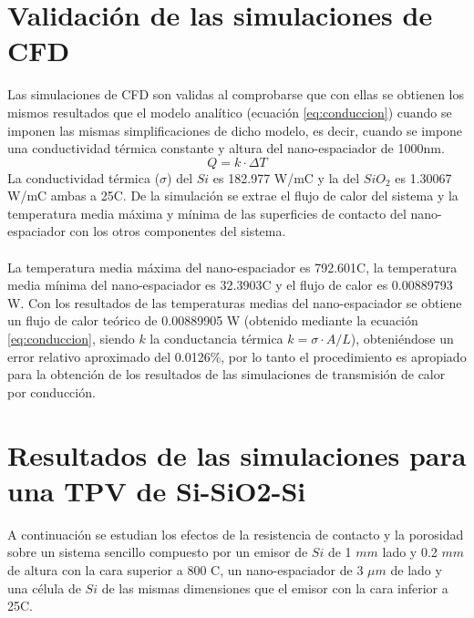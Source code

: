 \section{Validación de las simulaciones de CFD}
Las simulaciones de CFD son validas al comprobarse que con ellas se obtienen los mismos resultados que el modelo analítico (ecuación \eqref{eq:conduccion}) cuando se imponen las mismas simplificaciones de dicho modelo, es decir, cuando se impone una conductividad térmica constante y altura del nano-espaciador de 1000nm.
\begin{equation}
Q=k\cdot \Delta T
\label{eq:conduccion}
\end{equation}
La conductividad térmica ($\sigma$) del $Si$ es 182.977 W/m\textdegree C y la del $SiO_2$ es 1.30067 W/m\textdegree C ambas a 25\textdegree C. De la simulación se extrae el flujo de calor del sistema y la temperatura media máxima y mínima de las superficies de contacto del nano-espaciador con los otros componentes del sistema.\\\\
La temperatura media máxima del nano-espaciador es 792.601\textdegree C, la temperatura media mínima del nano-espaciador es 32.3903\textdegree C y el flujo de calor es 0.00889793 W. Con los resultados de las temperaturas medias del nano-espaciador se obtiene un flujo de calor teórico de 0.00889905 W (obtenido mediante la ecuación \eqref{eq:conduccion}, siendo $k$ la conductancia térmica $k=\sigma \cdot A/L$), obteniéndose un error relativo aproximado del 0.0126\%, por lo tanto el procedimiento es apropiado para la obtención de los resultados de las simulaciones de transmisión de calor por conducción.
\section{Resultados de las simulaciones para una TPV de Si-SiO2-Si}
A continuación se estudian los efectos de la resistencia de contacto y la porosidad sobre un sistema sencillo compuesto por un emisor de $Si$ de 1 $mm$ lado y 0.2 $mm$ de altura con la cara superior a 800 \textdegree C, un nano-espaciador de 3 $\mu m$ de lado y una célula de $Si$ de las mismas dimensiones que el emisor con la cara inferior a 25\textdegree C.
